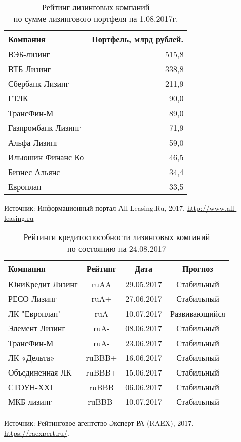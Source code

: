 \documentclass[_Banking_p3.tex]{subfiles}
\begin{document}
\begin{frame}[shrink=25]
\begin{table}[htbp]
  \centering
  \caption{Рейтинг лизинговых компаний\\ по сумме лизингового портфеля на 1.08.2017г.}
  	\begin{tabularx}{\linewidth}[b]{@{}>{\raggedright\arraybackslash}Xr@{}}
    \toprule
    Компания & Портфель, млрд рублей. \\
    \midrule
    ВЭБ-лизинг & 515,8 \\
    ВТБ Лизинг & 338,8 \\
    Сбербанк Лизинг & 211,9 \\
    ГТЛК & 90,0 \\
    ТрансФин-М & 89,0 \\
    Газпромбанк Лизинг & 71,9 \\
    Альфа-Лизинг & 59,0 \\
    Ильюшин Финанс Ко & 46,5 \\
    Бизнес Альянс & 34,4 \\
    Европлан & 33,5 \\
    \bottomrule
    \end{tabularx}%
  \label{tab:addlabel}%
\end{table}%
Источник: Информационный портал All-Leasing.Ru, 2017. \url{http://www.all-leasing.ru}
\end{frame}

\begin{frame}[shrink=25]
\begin{table}[htbp]
  \centering
  \caption{Рейтинги кредитоспособности лизинговых компаний\\ по состоянию на 24.08.2017}
  	\begin{tabularx}{\linewidth}[b]{@{}>{\raggedright\arraybackslash}Xccc@{}}
    \toprule
    Компания & Рейтинг & Дата  & Прогноз \\
    \midrule
    ЮниКредит Лизинг & ruAA  & 29.05.2017 & Стабильный \\
    РЕСО-Лизинг & ruA+  & 27.06.2017 & Стабильный \\
    ЛК "Европлан" & ruA   & 10.07.2017 & Развивающийся \\
    Элемент Лизинг & ruA-  & 08.06.2017 & Стабильный \\
    ТрансФин-М & ruA-  & 23.06.2017 & Стабильный \\
    ЛК «Дельта» & ruBBB+ & 16.06.2017 & Стабильный \\
    Объединенная ЛК & ruBBB+ & 15.06.2017 & Стабильный \\
    СТОУН-ХХI & ruBBB & 06.06.2017 & Стабильный \\
    МКБ-лизинг & ruBBB- & 10.07.2017 & Стабильный \\
    \bottomrule
    \end{tabularx}%
  \label{tab:addlabel}%
\end{table}%
Источник: Рейтинговое агентство Эксперт РА (RAEX), 2017. \url{https://raexpert.ru/}.
\end{frame}
\end{document}
